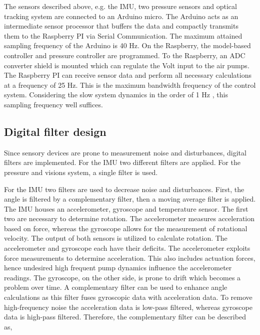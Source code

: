 The sensors described above, e.g. the IMU, two pressure sensors and optical tracking system are connected to an Arduino micro. The Arduino acts as an intermediate sensor processor that buffers the data and compactly transmits them to the Raspberry PI via Serial Communication. The maximum attained sampling frequency of the Arduino is 40 Hz. On the Raspberry, the model-based controller and pressure controller are programmed. To the Raspberry, an ADC converter shield is mounted which can regulate the Volt input to the air pumps. The Raspberry PI can receive sensor data and perform all necessary calculations at a frequency of 25 Hz. This is the maximum bandwidth frequency of the control system. Considering the slow system dynamics in the order of 1 Hz \cite{tawk2018bioinspired},\cite{HighBandwidthControl} this sampling frequency well suffices.





\subsection*{Digital filter design}

Since sensory devices are prone to measurement noise and disturbances, digital filters are implemented. For the IMU two different filters are applied. For the pressure and visions system, a single filter is used. 

For the IMU two filters are used to decrease noise and disturbances. First, the angle is filtered by a complementary filter, then a moving average filter is applied. The IMU houses an accelerometer, gyroscope and temperature sensor. The first two are necessary to determine rotation. The accelerometer measures acceleration based on force, whereas the gyroscope allows for the measurement of rotational velocity. The output of both sensors is utilized to calculate rotation. The accelerometer and gyroscope each have their deficits. The accelerometer exploits force measurements to determine acceleration. This also includes actuation forces, hence undesired high frequent pump dynamics influence the accelerometer readings. The gyroscope, on the other side, is prone to drift which becomes a problem over time. A complementary filter can be used to enhance angle calculations as this filter fuses gyroscopic data with acceleration data. To remove high-frequency noise the acceleration data is low-pass filtered, whereas gyroscope data is high-pass filtered. Therefore, the complementary filter can be described as, 

